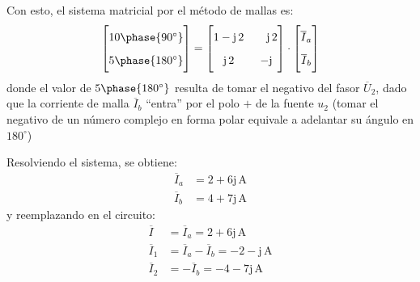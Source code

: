 \begin{example}
          Con esto, el sistema matricial por el método de mallas es:
          \begin{equation*}
            \begin{bmatrix}
              \vphantom{\dfrac{1}{1}}10\phase{90^\circ} \\[4pt]
              \vphantom{\dfrac{1}{1}}5\phase{180^\circ} 
            \end{bmatrix}
            =
            \begin{bmatrix}
              \vphantom{\dfrac{1}{1}}1-\mathrm{j}\,2 & \quad\mathrm{j}\,2 \\[4pt]
              \vphantom{\dfrac{1}{1}}\mathrm{j}\,2 & -\mathrm{j} \\
            \end{bmatrix}
            \cdot 
            \begin{bmatrix}
              \vphantom{\dfrac{1}{1}}\overline{I}_a\\[4pt]
              \vphantom{\dfrac{1}{1}}\overline{I}_b
            \end{bmatrix}
          \end{equation*}          
          donde el valor de $5\phase{\ang{180}}$ resulta de tomar el negativo del fasor $\overline{U}_2$, dado que la corriente de malla $\overline{I}_b$ ``entra'' por el polo $+$ de la fuente $u_2$ (tomar el negativo de un número complejo en forma polar equivale a adelantar su ángulo en $180^\circ$)

          \vspace{3mm}
          Resolviendo el sistema, se obtiene:
          \begin{align*}
            \overline{I}_a&= 2 + 6\mathrm{j}\,\unit{\ampere}\\
            \overline{I}_b&= 4 + 7\mathrm{j}\,\unit{\ampere}
          \end{align*}          
          y reemplazando en el circuito:
          \begin{align*}
            \overline{I}&=\overline{I}_a= 2 + 6\mathrm{j}\,\unit{\ampere}\\
            \overline{I}_1&=\overline{I}_a - \overline{I}_b= -2 -\mathrm{j}\,\unit{\ampere}\\
            \overline{I}_2&=-\overline{I}_b= -4 - 7\mathrm{j}\,\unit{\ampere}\\
          \end{align*}	


\end{example}
